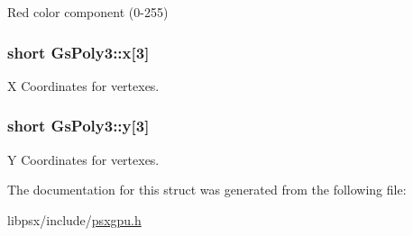 Red color component (0-\/255) 

\hypertarget{structGsPoly3_afb69db87ee5f1fd299a9aaeb14f55d2d}{}
\subsubsection[{x}]{\setlength{\rightskip}{0pt plus 5cm}short Gs\+Poly3\+::x\mbox{[}3\mbox{]}}\label{structGsPoly3_afb69db87ee5f1fd299a9aaeb14f55d2d}


X Coordinates for vertexes. 

\hypertarget{structGsPoly3_ab05b0a5a5e8d5bccfd03b5e1f15668a2}{}
\subsubsection[{y}]{\setlength{\rightskip}{0pt plus 5cm}short Gs\+Poly3\+::y\mbox{[}3\mbox{]}}\label{structGsPoly3_ab05b0a5a5e8d5bccfd03b5e1f15668a2}


Y Coordinates for vertexes. 



The documentation for this struct was generated from the following file\+:\begin{DoxyCompactItemize}
\item 
libpsx/include/\hyperlink{psxgpu_8h}{psxgpu.\+h}\end{DoxyCompactItemize}
